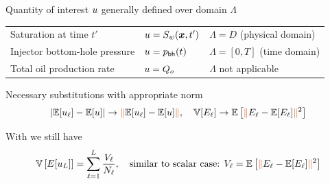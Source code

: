 \begin{frame}{\name{}}
    \begin{overlayarea}{\textwidth}{\frameheight}
        \vspace{1em}
        \begin{squarelist}
            \item<1-> Quantity of interest $u$ generally defined over domain $\Lambda$
            \begin{center}
                \small%
                \begin{tabular}{l|l|l}
                    Saturation at time $t'$ & $u = S_w(\bm{x}, t')$ & $\Lambda = D$ (physical domain)\\
                    Injector bottom-hole pressure & $u = p_{\mathsf{bh}}(t)$ & $\Lambda = [0,T]$ (time domain) \\
                    Total oil production rate & $u = Q_o$ & $\Lambda$ not applicable
                \end{tabular}
            \end{center}
            \vspace{0.5em}
            \item<2-> Necessary substitutions with appropriate norm \redtext{$\|\cdot\|$}
            \begin{equation*}
                |\expect[\un_\ell] - \expect[\un]| \rightarrow \redtext{\|}\expect[\un_\ell] - \expect[\un]\redtext{\|}, \quad \var[\expecta_\ell] \rightarrow \expect\left[\redtext{\|}\expecta_\ell - \expect[\expecta_\ell]\redtext{\|}^2\right]
            \end{equation*}
            \item<3-> With  we still have
            \begin{equation*}
                \var\left[\expecta[\un_\nlev]\right] = \sum_{\ell = 1}^\nlev \frac{\vara_\ell}{\nsamp_\ell}, \quad \text{similar to scalar case: } \vara_\ell = \expect\left[\redtext{\|}\expecta_\ell - \expect[\expecta_\ell]\redtext{\|}^2\right]
            \end{equation*}
        \end{squarelist}
    \end{overlayarea}
\end{frame}